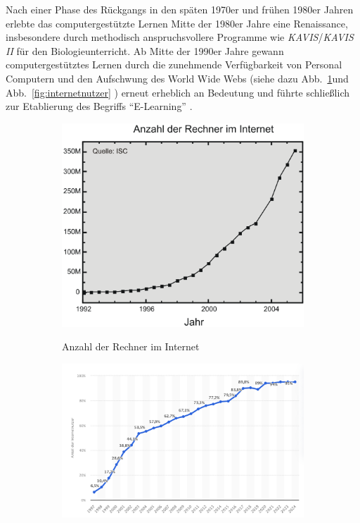 Nach einer Phase des Rückgangs in den späten 1970er und frühen 1980er Jahren erlebte das computergestützte Lernen Mitte der 1980er Jahre eine Renaissance, insbesondere durch methodisch anspruchsvollere Programme wie \textit{KAVIS}/\textit{KAVIS II} für den Biologieunterricht. Ab Mitte der 1990er Jahre gewann computergestütztes Lernen durch die zunehmende Verfügbarkeit von Personal Computern und den Aufschwung des World Wide Webs (siehe dazu Abb.~\ref{fig:rechner_internet}und Abb.~\ref{fig:internetnutzer} ) erneut erheblich an Bedeutung und führte schließlich zur Etablierung des Begriffs \enquote{E-Learning} \parencite[S.~11]{niegemann_kompendium_2008}.

\begin{figure}[h!]
    \centering
    \begin{subfigure}[b]{0.48\textwidth}
        \centering
        \includegraphics[width=\textwidth]{img/Anzahl_Rechner_im_Internet-2004.png}
        \caption{Anzahl der Rechner im Internet}
        \label{fig:rechner_internet}
		\cite{internet_systems_consortium_internet_2005}
    \end{subfigure}
    \hfill
    \begin{subfigure}[b]{0.48\textwidth}
        \centering
        \includegraphics[width=\textwidth]{img/Anzahl_Internetnutzer-2024.png}

\end{subfigure}
\end{figure}
